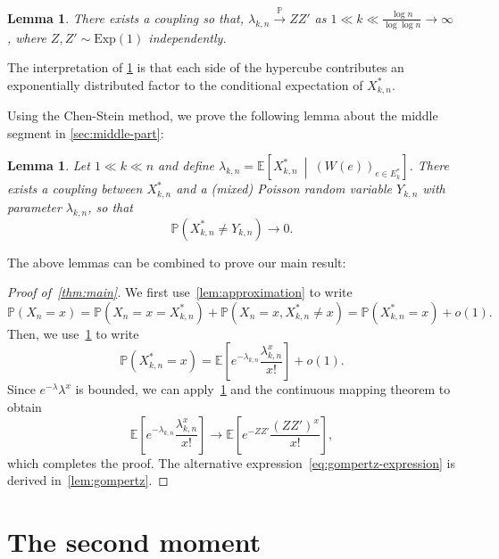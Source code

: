 \documentclass[11pt]{article}
\newtheorem{lemma}[theorem]{Lemma}
\theoremstyle{definition}
\theoremstyle{remark}
\theoremstyle{remark}
\numberwithin{theorem}{section}
\providecommand{\P}{}
\renewcommand{\P}{\mathbb{P}}
\newcommand{\E}{\mathbb{E}}
\begin{document}
\begin{lemma}\label{lem:trees-main}
    There exists a coupling so that, $\lambda_{k,n} \xrightarrow{\P} ZZ'$ as $1\ll k\ll \frac{\log n}{\log\log n}\to\infty$, where $Z,Z'\sim\text{Exp}(1)$ independently.
\end{lemma}

The interpretation of \cref{lem:trees-main} is that each side of the hypercube contributes an exponentially distributed factor to the conditional expectation of $X_{k,n}^{*}$. 

Using the Chen-Stein method, we prove the following lemma about the middle segment in \cref{sec:middle-part}:

\begin{lemma}\label{lem:middle}
	Let $1\ll k\ll n$ and define $\lambda_{k,n}=\E\left[X_{k,n}^{*}\ \middle|\ (W(e))_{e\in E_k^*}\right]$. There exists a coupling between $X_{k,n}^{*}$ and a (mixed) Poisson random variable $Y_{k,n}$ with parameter $\lambda_{k,n}$, so that
    \[
    \P(X_{k,n}^{*}\neq Y_{k,n})\to0.
    \]
\end{lemma}

The above lemmas can be combined to prove our main result:

\begin{proof}[Proof of~\cref{thm:main}]
    We first use~\cref{lem:approximation} to write
    \[
    \P(X_n=x)=\P(X_n=x=X_{k,n}^{*})+\P(X_n=x,X_{k,n}^{*}\neq x)=\P(X_{k,n}^{*}=x)+o(1).
    \]
    Then, we use~\cref{lem:middle} to write
    \[
    \P(X_{k,n}^{*}=x)=\E\left[e^{-\lambda_{k,n}}\frac{\lambda_{k,n}^x}{x!}\right]+o(1).
    \]
    Since $e^{-\lambda}\lambda^x$ is bounded, we can apply~\cref{lem:trees-main} and the continuous mapping theorem to obtain
    \[
    \E\left[e^{-\lambda_{k,n}}\frac{\lambda_{k,n}^x}{x!}\right]\to\E\left[e^{-ZZ'}\frac{(ZZ')^x}{x!}\right],
    \]
    which completes the proof. The alternative expression~\eqref{eq:gompertz-expression} is derived in~\cref{lem:gompertz}. 
\end{proof}

\section{The second moment}\label{sec:second_moment}
\end{document}
